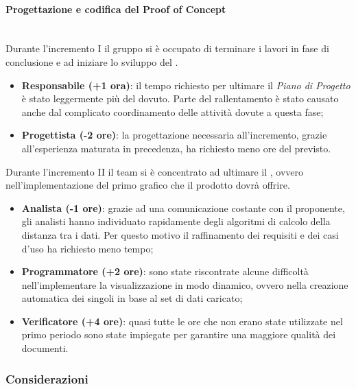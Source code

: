 \paragraph{Progettazione e codifica del Proof of Concept} \mbox{}\\

Durante l'incremento I il gruppo si è occupato di terminare i lavori in fase di conclusione e ad iniziare lo sviluppo del .

\begin{itemize}
\item \textbf{Responsabile (+1 ora)}: il tempo richiesto per ultimare il \textit{Piano di Progetto} è stato leggermente più del dovuto. Parte del rallentamento è stato causato anche dal complicato coordinamento delle attività dovute a questa fase;

\item \textbf{Progettista (-2 ore)}: la progettazione necessaria all'incremento, grazie all'esperienza maturata in precedenza, ha richiesto meno ore del previsto.

\end{itemize}

Durante l'incremento II il team si è concentrato ad ultimare il , ovvero nell'implementazione del primo grafico che il prodotto dovrà offrire.

\begin{itemize}
\item \textbf{Analista (-1 ore)}: grazie ad una comunicazione costante con il proponente, gli analisti hanno individuato rapidamente degli algoritmi di calcolo della distanza tra i dati. Per questo motivo il raffinamento dei requisiti e dei casi d'uso ha richiesto meno tempo;

\item \textbf{Programmatore (+2 ore)}: sono state riscontrate alcune difficoltà nell'implementare la visualizzazione  in modo dinamico, ovvero nella creazione automatica dei singoli  in base al set di dati caricato;

\item \textbf{Verificatore (+4 ore)}: quasi tutte le ore che non erano state utilizzate nel primo periodo sono state impiegate per garantire una maggiore qualità dei documenti.
\end{itemize}

\subsubsection{Considerazioni}

